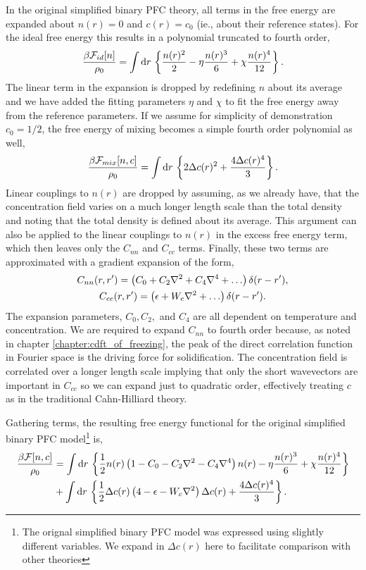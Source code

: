 In the original simplified binary PFC theory, all terms in the free energy are
expanded about $n(r) = 0$ and $c(r) = c_0$ (ie., about their reference states).
For the ideal free energy this results in a polynomial truncated to fourth
order,
%
\begin{equation}
    \label{ideal_expansion}
    \frac{\beta\mathcal{F}_{id}[n]}{\rho_0} = \int \mathrm{d}r\,
    \left\lbrace \frac{n(r)^2}{2} - \eta\frac{n(r)^3}{6} + \chi\frac{n(r)^4}{12} \right\rbrace.
\end{equation}
%
The linear term in the expansion is dropped by redefining $n$ about its average
and we have added the fitting parameters $\eta$ and $\chi$ to fit the free
energy away from the reference parameters. If we assume for simplicity of
demonstration $c_0 = 1/2$, the free energy of mixing becomes a simple fourth
order polynomial as well,
%
\begin{equation}
    \frac{\beta\mathcal{F}_{mix}[n, c]}{\rho_0} = \int \mathrm{d}r\, \left\lbrace
       2\Delta c(r)^2 + \frac{4\Delta c(r)^4}{3}
    \right\rbrace.
\end{equation}
%
Linear couplings to $n(r)$ are dropped by assuming, as we already have, that
the concentration field varies on a much longer length scale than the total
density and noting that the total density is defined about its average. This
argument can also be applied to the linear couplings to $n(r)$ in the excess free
energy term, which then leaves only the $C_{nn}$ and $C_{cc}$ terms. Finally, these
two terms are approximated with a gradient expansion of the form,
%
\begin{gather}
    C_{nn}(r, r^\prime) = \l( C_0 + C_2 \nabla^2 + C_4 \nabla^4 + \dots\r)
        \d(r - r^\prime), \\
    C_{cc}(r, r^\prime) = \l(\epsilon + W_c \nabla^2 + \dots\r)
        \d(r - r^\prime).
\end{gather}
%
The expansion parameters, $C_0, C_2,$ and $C_4$ are all dependent on
temperature and concentration. We are required to expand $C_{nn}$ to fourth
order because, as noted in chapter \ref{chapter:cdft_of_freezing}, the peak of
the direct correlation function in Fourier space is the driving force for
solidification.  The concentration field is correlated over a longer length
scale implying that only the short wavevectors are important in $C_{cc}$ so we
can expand just to quadratic order, effectively treating $c$ as in the
traditional Cahn-Hilliard theory.

Gathering terms, the resulting free energy functional for the original
simplified binary PFC model\footnote{The orignal simplified binary PFC model
was expressed using slightly different variables. We expand in $\Delta c(r)$
here to facilitate comparison with other theories} is,
%
\begin{align}
    \frac{\beta\mathcal{F}[n, c]}{\rho_0} &= \int \mathrm{d}r\, \left\lbrace 
        \frac{1}{2} n(r) \left( 1 - C_0 - C_2 \nabla^2 - C_4\nabla^4 \right) n(r)
      - \eta\frac{n(r)^3}{6} + \chi\frac{n(r)^4}{12} \right\rbrace \\
    &+ \int \mathrm{d}r\, \left\lbrace
        \frac{1}{2} \Delta c(r) \left( 4 - \epsilon - W_c\nabla^2 \right) \Delta c(r) 
      + \frac{4 \Delta c(r)^4}{3} \right\rbrace. \nonumber
\end{align}
%

